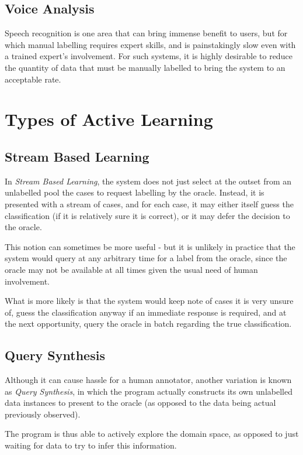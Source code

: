 \documentclass[a4paper,11pt]{report}
\begin{document}
\subsection{Voice Analysis}

Speech recognition is one area that can bring immense benefit to users, but for which manual labelling requires expert skills, and is painstakingly slow even with a trained expert's involvement. For such systems, it is highly desirable to reduce the quantity of data that must be manually labelled to bring the system to an acceptable rate.



\section{Types of Active Learning}
\subsection{Stream Based Learning}
In \emph{Stream Based Learning}, the system does not just select at the outset from an unlabelled pool the cases to request labelling by the oracle. Instead, it is presented with a stream of cases, and for each case, it may either itself guess the classification (if it is relatively sure it is correct), or it may defer the decision to the oracle.

This notion can sometimes be more useful - but it is unlikely in practice that the system would query at any arbitrary time for a label from the oracle, since the oracle may not be available at all times given the usual need of human involvement.

What is more likely is that the system would keep note of cases it is very unsure of, guess the classification anyway if an immediate response is required, and at the next opportunity, query the oracle in batch regarding the true classification.

\subsection{Query Synthesis}
Although it can cause hassle for a human annotator, another variation is known as \emph{Query Synthesis}, in which the program actually constructs its own unlabelled data instances to present to the oracle (as opposed to the data being actual previously observed).

The program is thus able to actively explore the domain space, as opposed to just waiting for data to try to infer this information.
\end{document}
